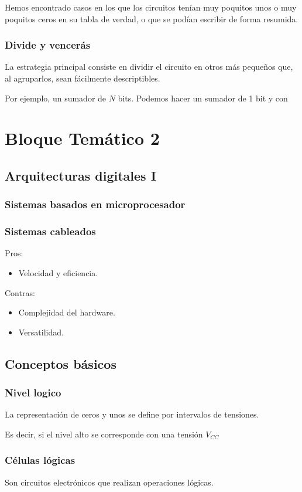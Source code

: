 \documentclass[a4paper]{book}
\begin{document}
Hemos encontrado casos en los que los circuitos tenían muy poquitos unos o muy poquitos ceros en su tabla de verdad, o que se podían escribir de forma resumida.

\subsection{Divide y vencerás}
La estrategia principal consiste en dividir el circuito en otros más pequeños que, al agruparlos, sean fácilmente descriptibles.

Por ejemplo, un sumador de $N$ bits. Podemos hacer un sumador de 1 bit y con

\chapter{Bloque Temático 2} 
\section{Arquitecturas digitales I}
\subsection{Sistemas basados en microprocesador}
\subsection{Sistemas cableados}
Pros: \begin{itemize}
\item Velocidad y eficiencia. 
\end{itemize}
Contras: \begin{itemize}
\item Complejidad del hardware.
\item Versatilidad. 
\end{itemize}

\section{Conceptos básicos}
\subsection{Nivel logico}
La representación de ceros y unos se define por intervalos de tensiones.

Es decir, si el nivel alto se corresponde con una tensión $V_{CC}$

\subsection{Células lógicas}
Son circuitos electrónicos que realizan operaciones lógicas.
\end{document}
